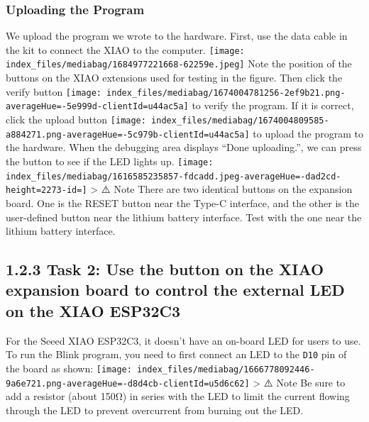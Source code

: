 \documentclass[
  letterpaper,
  DIV=11,
  numbers=noendperiod]{scrreprt}
\begin{document}
\hypertarget{uploading-the-program}{%
\subsubsection*{Uploading the Program}\label{uploading-the-program}}

We upload the program we wrote to the hardware. First, use the data
cable in the kit to connect the XIAO to the computer.
\texttt{[image: index\_files/mediabag/1684977221668-62259e.jpeg]} Note
the position of the buttons on the XIAO extensions used for testing in
the figure. Then click the verify button
\texttt{[image: index\_files/mediabag/1674004781256-2ef9b21.png-averageHue=-5e999d-clientId=u44ac5a]}
to verify the program. If it is correct, click the upload button
\texttt{[image: index\_files/mediabag/1674004809585-a884271.png-averageHue=-5c979b-clientId=u44ac5a]}
to upload the program to the hardware. When the debugging area displays
``Done uploading.'', we can press the button to see if the LED lights
up.
\texttt{[image: index\_files/mediabag/1616585235857-fdcadd.jpeg-averageHue=-dad2cd-height=2273-id=]}
\textgreater{} ⚠️ Note There are two identical buttons on the expansion
board. One is the RESET button near the Type-C interface, and the other
is the user-defined button near the lithium battery interface. Test with
the one near the lithium battery interface.

\hypertarget{task-2-use-the-button-on-the-xiao-expansion-board-to-control-the-external-led-on-the-xiao-esp32c3}{%
\subsection*{1.2.3 Task 2: Use the button on the XIAO expansion board to
control the external LED on the XIAO
ESP32C3}\label{task-2-use-the-button-on-the-xiao-expansion-board-to-control-the-external-led-on-the-xiao-esp32c3}}

For the Seeed XIAO ESP32C3, it doesn't have an on-board LED for users to
use. To run the Blink program, you need to first connect an LED to the
\texttt{D10} pin of the board as shown:
\texttt{[image: index\_files/mediabag/1666778092446-9a6e721.png-averageHue=-d8d4cb-clientId=u5d6c62]}
\textgreater{} ⚠️ Note Be sure to add a resistor (about 150Ω) in series
with the LED to limit the current flowing through the LED to prevent
overcurrent from burning out the LED.
\end{document}
